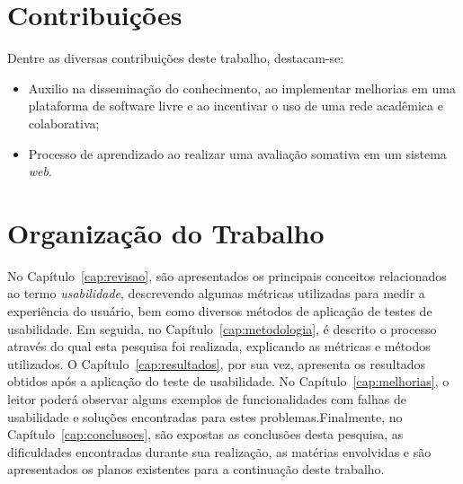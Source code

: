 \section{Contribuições}
\label{sec:contribucoes}

    Dentre as diversas contribuições deste trabalho, destacam-se:

\begin{itemize}
  \item {
    Auxilio na disseminação do conhecimento, ao implementar melhorias em uma plataforma de software livre e ao incentivar o uso de uma rede acadêmica e colaborativa;
  }
  \item {
    Processo de aprendizado ao realizar uma avaliação somativa em um sistema \emph{web}.
  }
\end{itemize}

\section{Organização do Trabalho}
\label{sec:organizacao_trabalho}

No Capítulo~\ref{cap:revisao}, são apresentados os principais conceitos relacionados ao termo \emph{usabilidade}, descrevendo algumas métricas utilizadas para medir a experiência do usuário, bem como diversos métodos de aplicação de testes de usabilidade. 
Em seguida, no Capítulo~\ref{cap:metodologia}, é descrito o processo através do qual esta pesquisa foi realizada, explicando as métricas e métodos utilizados. O Capítulo~\ref{cap:resultados}, por sua vez, apresenta os resultados obtidos após a aplicação do teste de usabilidade. No Capítulo~\ref{cap:melhorias}, o leitor poderá observar alguns exemplos de funcionalidades com falhas de usabilidade e soluções encontradas para estes problemas.Finalmente, no
Capítulo~\ref{cap:conclusoes}, são expostas as conclusões desta pesquisa, as dificuldades encontradas durante sua realização, as matérias envolvidas e são apresentados os planos existentes para a continuação deste trabalho.

